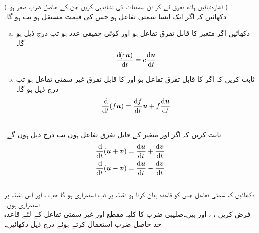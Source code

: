 (اشارہ:بائیں ہاتھ تفرق لے کر ان سمتیات کی نشاندہی کریں جن کے  حاصل ضرب صفر ہو۔ )
\\
دکھائیں کہ اگر  ایک ایسا سمتی تفاعل ہو جس کی قیمت مستقل  ہو  تب  ہو گا۔
\\
\begin{enumerate}[a.]
\item
دکھائیں اگر  متغیر  کا قابل تفرق تفاعل ہو اور  کوئی حقیقی عدد ہو تب درج ذیل ہو گا۔
\begin{align*}
\frac{\dif(c\kvec{u})}{\dif t}=c\frac{\dif \kvec{u}}{\dif t}
\end{align*}
\item
ثابت کریں کہ  اگر  کا  قابل تفرق تفاعل ہو اور  کا  قابل تفرق  غیر سمتی  تفاعل ہو تب درج ذیل ہو گا۔
\begin{align*}
\frac{\dif}{\dif t}(f\kvec{u})=\frac{\dif f}{\dif t}\kvec{u}+f\frac{\dif \kvec{u}}{\dif t}
\end{align*}
\end{enumerate}
\\
ثابت کریں کہ اگر  اور  متغیر  کے قابل تفرق تفاعل ہوں تب درج ذیل ہوں  گے۔
\begin{align*}
\frac{\dif}{\dif t}(\kvec{u}+\kvec{v})=\frac{\dif \kvec{u}}{\dif t}+\frac{\dif \kvec{v}}{\dif t}\\
\frac{\dif}{\dif t}(\kvec{u}-\kvec{v})=\frac{\dif \kvec{u}}{\dif t}-\frac{\dif \kvec{v}}{\dif t}
\end{align*}
\\
دکھائیں کہ سمتی تفاعل  جس کو قاعدہ  بیان کرتا ہو نقطہ  پر تب استمراری ہو گا جب ،  اور  اس نقطہ پر استمراری ہوں۔
\\
فرض کریں ،    ،    اور  ہیں۔صلیبی ضرب کا کلیہ مقطع اور غیر سمتی تفاعل کے لئے قاعدہ حد حاصل ضرب استعمال کرتے ہوئے  درج ذیل دکھائیں۔
